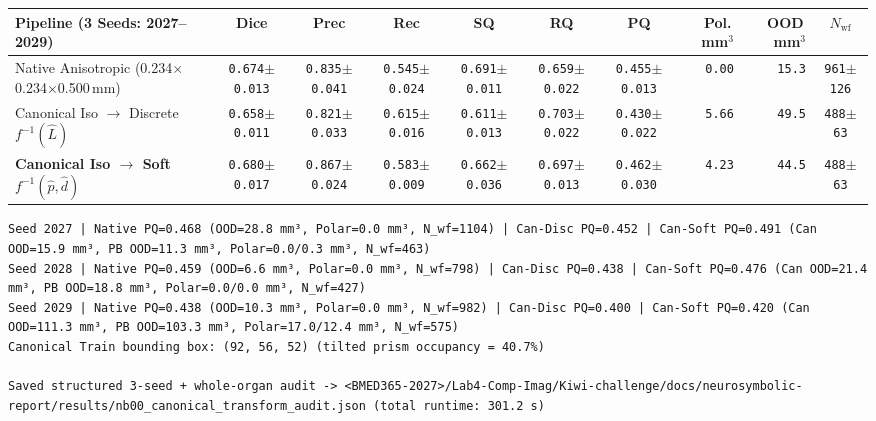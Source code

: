 \documentclass[10pt,a4paper]{article}
\renewcommand{\_}{\origunderscore\allowbreak}
\begin{document}
\begin{outbox}
{\fontsize{6.4pt}{7.8pt}\selectfont
\setlength{\tabcolsep}{2.1pt}
\renewcommand{\arraystretch}{1.18}
\begin{tabularx}{\linewidth}{Y c c c c c c r r c}
\toprule
{}\textbf{Pipeline (3 Seeds: 2027--2029)} & \textbf{Dice} & \textbf{Prec} & \textbf{Rec} & \textbf{SQ} & \textbf{RQ} & \textbf{PQ} & \textbf{Pol.\,mm$^3$} & \textbf{OOD\,mm$^3$} & \textbf{$N_{\text{wf}}$} \\
\midrule
Native Anisotropic (0.234$\times$0.234$\times$0.500\,mm) & \texttt{0.674$\pm$0.013} & \texttt{0.835$\pm$0.041} & \texttt{0.545$\pm$0.024} & \texttt{0.691$\pm$0.011} & \texttt{0.659$\pm$0.022} & \texttt{0.455$\pm$0.013} & \texttt{0.00} & \texttt{15.3} & \texttt{961$\pm$126} \\
Canonical Iso $\to$ Discrete $f^{-1}(\hat{L})$ & \texttt{0.658$\pm$0.011} & \texttt{0.821$\pm$0.033} & \texttt{0.615$\pm$0.016} & \texttt{0.611$\pm$0.013} & \texttt{0.703$\pm$0.022} & \texttt{0.430$\pm$0.022} & \texttt{5.66} & \texttt{49.5} & \texttt{488$\pm$63} \\
\textbf{Canonical Iso $\to$ Soft $f^{-1}(\hat{p}, \hat{d})$} & \texttt{0.680$\pm$0.017} & \texttt{0.867$\pm$0.024} & \texttt{0.583$\pm$0.009} & \texttt{0.662$\pm$0.036} & \texttt{0.697$\pm$0.013} & \texttt{0.462$\pm$0.030} & \texttt{4.23} & \texttt{44.5} & \texttt{488$\pm$63} \\
\bottomrule
\end{tabularx}
}
\vspace{3pt}
\begin{lstlisting}[style=outbmed]
Seed 2027 | Native PQ=0.468 (OOD=28.8 mm³, Polar=0.0 mm³, N_wf=1104) | Can-Disc PQ=0.452 | Can-Soft PQ=0.491 (Can OOD=15.9 mm³, PB OOD=11.3 mm³, Polar=0.0/0.3 mm³, N_wf=463)
Seed 2028 | Native PQ=0.459 (OOD=6.6 mm³, Polar=0.0 mm³, N_wf=798) | Can-Disc PQ=0.438 | Can-Soft PQ=0.476 (Can OOD=21.4 mm³, PB OOD=18.8 mm³, Polar=0.0/0.0 mm³, N_wf=427)
Seed 2029 | Native PQ=0.438 (OOD=10.3 mm³, Polar=0.0 mm³, N_wf=982) | Can-Disc PQ=0.400 | Can-Soft PQ=0.420 (Can OOD=111.3 mm³, PB OOD=103.3 mm³, Polar=17.0/12.4 mm³, N_wf=575)
Canonical Train bounding box: (92, 56, 52) (tilted prism occupancy = 40.7%)

Saved structured 3-seed + whole-organ audit -> <BMED365-2027>/Lab4-Comp-Imag/Kiwi-challenge/docs/neurosymbolic-report/results/nb00_canonical_transform_audit.json (total runtime: 301.2 s)
\end{lstlisting}
\end{outbox}
\end{document}
